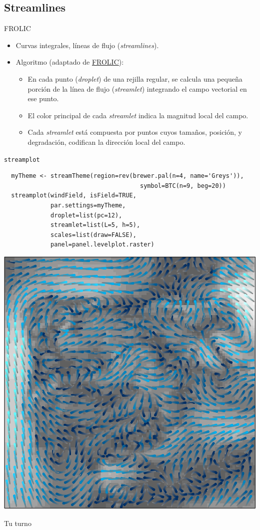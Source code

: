 \documentclass[xcolor={usenames,svgnames,dvipsnames}]{beamer}
\begin{document}
\subsection{Streamlines}
\label{sec-5-3}
\begin{frame}[label=sec-5-3-1]{FROLIC}
\begin{itemize}
\item Curvas integrales, líneas de flujo (\emph{streamlines}).
\item Algoritmo (adaptado de \href{https://www.cg.tuwien.ac.at/research/vis-dyn-syst/frolic/frolic_crc.pdf}{FROLIC}):
\begin{itemize}
\item En cada punto (\emph{droplet}) de una
rejilla regular, se calcula una pequeña porción de la línea de
flujo (\emph{streamlet}) integrando el campo vectorial en ese punto.
\item El color principal de cada \emph{streamlet} indica la magnitud local del campo.
\item Cada \emph{streamlet} está compuesta por puntos cuyos tamaños,
posición, y degradación, codifican la dirección local del campo.
\end{itemize}
\end{itemize}
\end{frame}

\begin{frame}[fragile,label=sec-5-3-2]{\texttt{streamplot}}
 \lstset{language=R,label= ,caption= ,numbers=none}
\begin{lstlisting}
  myTheme <- streamTheme(region=rev(brewer.pal(n=4, name='Greys')),
                                      symbol=BTC(n=9, beg=20))
  streamplot(windField, isField=TRUE,
             par.settings=myTheme,
             droplet=list(pc=12),
             streamlet=list(L=5, h=5),
             scales=list(draw=FALSE),
             panel=panel.levelplot.raster)
\end{lstlisting}
\end{frame}

\begin{frame}[label=sec-5-3-3]{}
\includegraphics[width=.9\linewidth]{figs/streamplot.pdf}
\end{frame}

\begin{frame}[label=sec-5-3-4]{Tu turno}

\end{frame}
\end{document}
